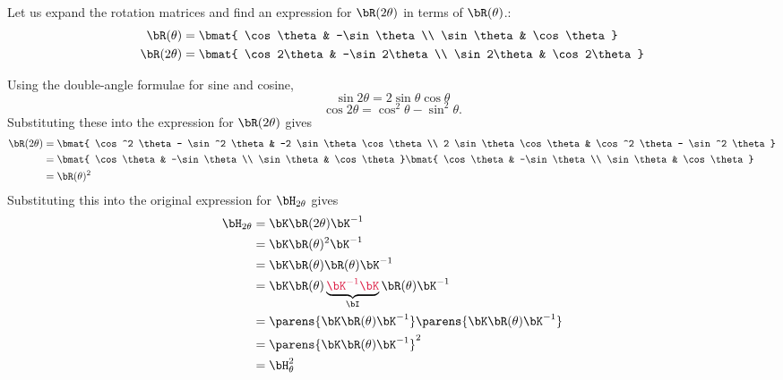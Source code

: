 \begin{problem}
\begin{enumroman}
\begin{answer}
        Let us expand the rotation matrices and find an expression
        for $\bR(2\theta)$ in terms of $\bR(\theta)$.:
        \begin{align*}
          \bR(\theta) &= \bmat{
            \cos \theta & -\sin \theta \\
            \sin \theta & \cos \theta
          } \\
          \bR(2\theta) &= \bmat{
            \cos 2\theta & -\sin 2\theta \\
            \sin 2\theta & \cos 2\theta
          }
        \end{align*}

        Using the double-angle formulae for sine and cosine,
        \[ \sin 2\theta = 2 \sin \theta \cos \theta \]
        \[ \cos 2\theta = \cos^2 \theta - \sin^2 \theta. \]
        Substituting these into the expression for $\bR(2\theta)$ gives
        \begin{align*}
          \bR(2\theta) &= \bmat{
            \cos^2 \theta - \sin^2 \theta & -2 \sin \theta \cos \theta \\
            2 \sin \theta \cos \theta & \cos^2 \theta - \sin^2 \theta
          } \\
          &= \bmat{
            \cos \theta & -\sin \theta \\
            \sin \theta & \cos \theta
          } \bmat{
            \cos \theta & -\sin \theta \\
            \sin \theta & \cos \theta
          } \\
          &= \bR(\theta)^2
        \end{align*}
        Substituting this into the original expression for $\bH_{2\theta}$ gives
        \begin{align*}
          \bH_{2\theta} &= \bK \bR(2\theta) \bK^{-1} \\
          &= \bK \bR(\theta)^2 \bK^{-1} \\
          &= \bK \bR(\theta) \bR(\theta) \bK^{-1} \\
          &= \bK \bR(\theta) \underbrace{\crim{\bK^{-1} \bK}}_{\bI} \bR(\theta) \bK^{-1} \\
          &= \parens{\bK \bR(\theta) \bK^{-1}}\parens{\bK \bR(\theta) \bK^{-1}} \\
          &= \parens{\bK \bR(\theta) \bK^{-1}}^2 \\
          &= \bH_\theta^2
        \end{align*}
      \end{answer}
  \end{enumroman}
\end{problem}
